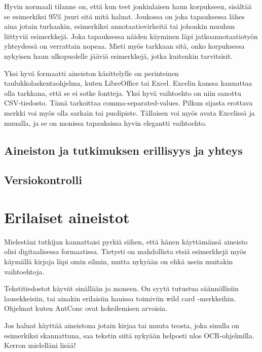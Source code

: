 \documentclass[]{book}
\begin{document}
Hyvin normaali tilanne on, että kun teet jonkinlaisen haun korpukseen,
sisältää se esimerkiksi 95\% juuri sitä mitä haluat. Joukossa on joka
tapauksessa lähes aina jotain turhaakin, esimerkiksi annotaatiovirheitä
tai johonkin muuhun liittyviä esimerkkejä. Joka tapauksessa näiden
käyminen läpi jatkoannotaatiotyön yhteydessä on verrattain nopeaa. Mieti
myös tarkkaan sitä, onko korpuksessa nykyisen haun ulkopuolelle jääviä
esimerkkejä, jotka kuitenkin tarvitsisit.

Yksi hyvä formaatti aineiston käsittelylle on perinteinen
taulukkolaskentaohjelma, kuten LibreOffice tai Excel. Excelin kanssa
kannattaa olla tarkkana, että se ei sotke fontteja. Yksi hyvä vaihtoehto
on niin sanottu CSV-tiedosto. Tämä tarkoittaa comma-separated-values.
Pilkun sijasta erottava merkki voi myös olla sarkain tai puolipiste.
Tällaisen voi myös avata Excelissä ja muualla, ja se on monissa
tapauksissa hyvin elegantti vaihtoehto.

\hypertarget{aineiston-ja-tutkimuksen-erillisyys-ja-yhteys}{%
\section{Aineiston ja tutkimuksen erillisyys ja
yhteys}\label{aineiston-ja-tutkimuksen-erillisyys-ja-yhteys}}

\hypertarget{versiokontrolli}{%
\section{Versiokontrolli}\label{versiokontrolli}}

\hypertarget{erilaiset-aineistot}{%
\chapter{Erilaiset aineistot}\label{erilaiset-aineistot}}

Mielestäni tutkijan kannattaisi pyrkiä siihen, että hänen käyttämänsä
aineisto olisi digitaalisessa formaatissa. Tietysti on mahdollista etsiä
esimerkkejä myös käymällä kirjoja läpi omin silmin, mutta nykyään on
ehkä usein muitakin vaihtoehtoja.

Tekstitiedostot käyvät sinällään jo moneen. On syytä tutustua
säännöllisiin lausekkeisiin, tai ainakin erilaisiin hauissa toimiviin
wild card -merkkeihin. Ohjelmat kuten AntConc ovat kokeilemisen
arvoisia.

Jos haluat käyttää aineistona jotain kirjaa tai muuta teosta, joka
sinulla on esimerkiksi skannattuna, saa tekstin siitä nykyään helposti
ulos OCR-ohjelmilla. Kerron mielelläni lisää!
\end{document}
